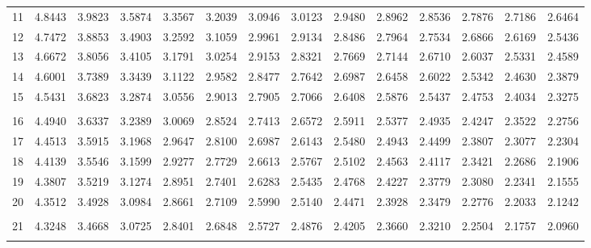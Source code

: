 {\begin{tabular}{l|lllllllllllll}
\\ 
 11 & 4.8443 & 3.9823 & 3.5874 & 3.3567 & 3.2039 & 3.0946 & 3.0123 & 2.9480 & 2.8962 & 2.8536 & 2.7876 & 2.7186 & 2.6464 \\[5pt] \arrayrulecolor{light-gray}\hline\arrayrulecolor{black}  
 12 & 4.7472 & 3.8853 & 3.4903 & 3.2592 & 3.1059 & 2.9961 & 2.9134 & 2.8486 & 2.7964 & 2.7534 & 2.6866 & 2.6169 & 2.5436 \\[5pt] \arrayrulecolor{light-gray}\hline\arrayrulecolor{black}  
 13 & 4.6672 & 3.8056 & 3.4105 & 3.1791 & 3.0254 & 2.9153 & 2.8321 & 2.7669 & 2.7144 & 2.6710 & 2.6037 & 2.5331 & 2.4589 \\[5pt] \arrayrulecolor{light-gray}\hline\arrayrulecolor{black}  
 14 & 4.6001 & 3.7389 & 3.3439 & 3.1122 & 2.9582 & 2.8477 & 2.7642 & 2.6987 & 2.6458 & 2.6022 & 2.5342 & 2.4630 & 2.3879 \\[5pt] \arrayrulecolor{light-gray}\hline\arrayrulecolor{black}  
 15 & 4.5431 & 3.6823 & 3.2874 & 3.0556 & 2.9013 & 2.7905 & 2.7066 & 2.6408 & 2.5876 & 2.5437 & 2.4753 & 2.4034 & 2.3275 \\[5pt] \arrayrulecolor{light-gray}\hline\arrayrulecolor{black}  
\\ 
 16 & 4.4940 & 3.6337 & 3.2389 & 3.0069 & 2.8524 & 2.7413 & 2.6572 & 2.5911 & 2.5377 & 2.4935 & 2.4247 & 2.3522 & 2.2756 \\[5pt] \arrayrulecolor{light-gray}\hline\arrayrulecolor{black}  
 17 & 4.4513 & 3.5915 & 3.1968 & 2.9647 & 2.8100 & 2.6987 & 2.6143 & 2.5480 & 2.4943 & 2.4499 & 2.3807 & 2.3077 & 2.2304 \\[5pt] \arrayrulecolor{light-gray}\hline\arrayrulecolor{black}  
 18 & 4.4139 & 3.5546 & 3.1599 & 2.9277 & 2.7729 & 2.6613 & 2.5767 & 2.5102 & 2.4563 & 2.4117 & 2.3421 & 2.2686 & 2.1906 \\[5pt] \arrayrulecolor{light-gray}\hline\arrayrulecolor{black}  
 19 & 4.3807 & 3.5219 & 3.1274 & 2.8951 & 2.7401 & 2.6283 & 2.5435 & 2.4768 & 2.4227 & 2.3779 & 2.3080 & 2.2341 & 2.1555 \\[5pt] \arrayrulecolor{light-gray}\hline\arrayrulecolor{black}  
 20 & 4.3512 & 3.4928 & 3.0984 & 2.8661 & 2.7109 & 2.5990 & 2.5140 & 2.4471 & 2.3928 & 2.3479 & 2.2776 & 2.2033 & 2.1242 \\[5pt] \arrayrulecolor{light-gray}\hline\arrayrulecolor{black}  
\\ 
 21 & 4.3248 & 3.4668 & 3.0725 & 2.8401 & 2.6848 & 2.5727 & 2.4876 & 2.4205 & 2.3660 & 2.3210 & 2.2504 & 2.1757 & 2.0960 \\[5pt] \arrayrulecolor{light-gray}\hline\arrayrulecolor{black}  

\end{tabular}}
